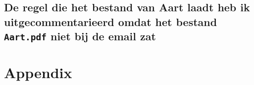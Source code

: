 \documentclass[a4paper]{exam}
\theoremstyle{definition}
\begin{document}
\subsection{{\color{blue}De regel die het bestand van Aart laadt heb ik uitgecommentarieerd omdat het bestand \texttt{Aart.pdf} niet bij de email zat}}

%		
		
\appendix
\section{Appendix}

\newpage

\newpage
{}
\begin{scriptsize}\printindex\end{scriptsize}
\end{document}
